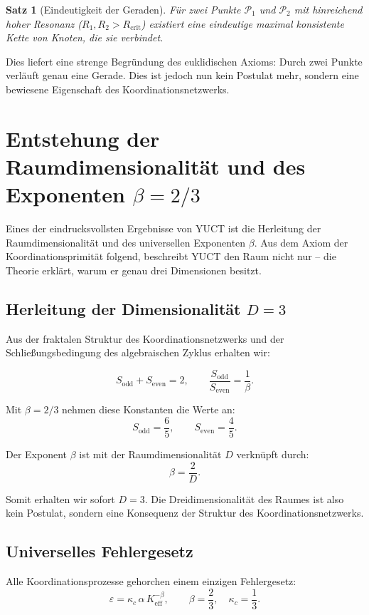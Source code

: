 \documentclass[12pt,a4paper]{article}
\newtheorem{satz}{Satz}
\newcommand{\Keff}{K_{\mathrm{eff}}}
\newcommand{\kappac}{\kappa_c}
\newcommand{\eps}{\varepsilon}
\newcommand{\betaf}{\beta}
\newcommand{\Sodd}{S_{\mathrm{odd}}}
\newcommand{\Seven}{S_{\mathrm{even}}}
\newcommand{\Rcrit}{R_{\mathrm{crit}}}
\newcommand{\calP}{\mathcal{P}}
\begin{document}
	\begin{satz}[Eindeutigkeit der Geraden]
		Für zwei Punkte \(\calP_1\) und \(\calP_2\) mit hinreichend hoher Resonanz (\(R_1, R_2 > \Rcrit\)) existiert eine eindeutige maximal konsistente Kette von Knoten, die sie verbindet.
	\end{satz}
	
	Dies liefert eine strenge Begründung des euklidischen Axioms: Durch zwei Punkte verläuft genau eine Gerade. Dies ist jedoch nun kein Postulat mehr, sondern eine bewiesene Eigenschaft des Koordinationsnetzwerks.
	
	\section{Entstehung der Raumdimensionalität und des Exponenten \(\betaf = 2/3\)}
	
	Eines der eindrucksvollsten Ergebnisse von YUCT ist die Herleitung der Raumdimensionalität und des universellen Exponenten \(\betaf\). Aus dem Axiom der Koordinationsprimität folgend, beschreibt YUCT den Raum nicht nur – die Theorie erklärt, warum er genau drei Dimensionen besitzt.
	
	\subsection{Herleitung der Dimensionalität \(D=3\)}
	
	Aus der fraktalen Struktur des Koordinationsnetzwerks und der Schließungsbedingung des algebraischen Zyklus erhalten wir:
	
	\[
	\Sodd + \Seven = 2, \qquad \frac{\Sodd}{\Seven} = \frac{1}{\betaf}.
	\]
	
	Mit \(\betaf = 2/3\) nehmen diese Konstanten die Werte an:
	\[
	\Sodd = \frac{6}{5}, \qquad \Seven = \frac{4}{5}.
	\]
	
	Der Exponent \(\betaf\) ist mit der Raumdimensionalität \(D\) verknüpft durch:
	\[
	\betaf = \frac{2}{D}.
	\]
	
	Somit erhalten wir sofort \(D = 3\). Die Dreidimensionalität des Raumes ist also kein Postulat, sondern eine Konsequenz der Struktur des Koordinationsnetzwerks.
	
	\subsection{Universelles Fehlergesetz}
	
	Alle Koordinationsprozesse gehorchen einem einzigen Fehlergesetz:
	\[
	\eps = \kappac\,\alpha\,\Keff^{-\betaf}, \qquad \betaf = \frac{2}{3}, \quad \kappac = \frac{1}{3}.
	\]
	
\end{document}
